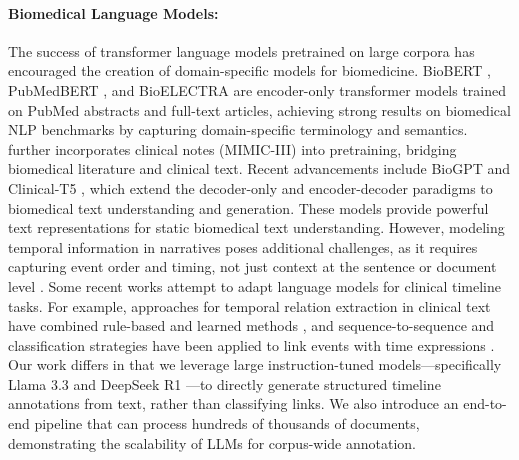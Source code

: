 \paragraph{Biomedical Language Models:} 
The success of transformer language models pretrained on large corpora has encouraged the creation of domain-specific models for biomedicine.
BioBERT \cite{lee2020biobert}, PubMedBERT \cite{gu2021domain}, and BioELECTRA \cite{kanakarajan2021bioelectra} are encoder-only transformer models trained on PubMed abstracts and full-text articles, achieving strong results on biomedical NLP benchmarks by capturing domain-specific terminology and semantics.
\cite{peng2020empirical} further incorporates clinical notes (MIMIC-III) into pretraining, bridging biomedical literature and clinical text.
Recent advancements include BioGPT \cite{luo2022biogpt} and Clinical-T5 \cite{lehman2023clinical}, which extend the decoder-only and encoder-decoder paradigms to biomedical text understanding and generation.
These models provide powerful text representations for static biomedical text understanding.
However, modeling temporal information in narratives poses additional challenges, as it requires capturing event order and timing, not just context at the sentence or document level \cite{zhou2021clinical, cui2025timer}.
Some recent works attempt to adapt language models for clinical timeline tasks.
For example, approaches for temporal relation extraction in clinical text have combined rule-based and learned methods \cite{wang2025large}, and sequence-to-sequence and classification strategies have been applied to link events with time expressions \cite{lee2016uthealth, tourille2017temporal, alfattni2020extraction, moharasan2019extraction}.
Our work differs in that we leverage large instruction-tuned models—specifically Llama 3.3 \cite{grattafiori2024llama} and DeepSeek R1 \cite{guo2025deepseek}—to directly generate structured timeline annotations from text, rather than classifying links.
We also introduce an end-to-end pipeline that can process hundreds of thousands of documents, demonstrating the scalability of LLMs for corpus-wide annotation.


